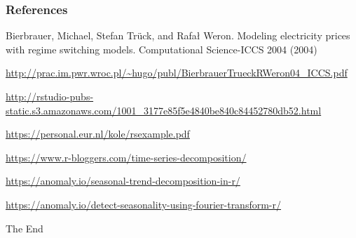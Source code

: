\documentclass{beamer}
\begin{document}

\begin{frame}
\frametitle{References}
\footnotesize{
\begin{thebibliography}{99} %
 Bierbrauer, Michael, Stefan Trück, and Rafał Weron.
\newblock Modeling electricity prices with regime switching models.
\newblock Computational Science-ICCS 2004 (2004)

 \url{http://prac.im.pwr.wroc.pl/~hugo/publ/BierbrauerTrueckRWeron04_ICCS.pdf}

 \url{http://rstudio-pubs-static.s3.amazonaws.com/1001_3177e85f5e4840be840c84452780db52.html}

 \url{https://personal.eur.nl/kole/rsexample.pdf}

 \url{https://www.r-bloggers.com/time-series-decomposition/}

 \url{https://anomaly.io/seasonal-trend-decomposition-in-r/}

 \url{https://anomaly.io/detect-seasonality-using-fourier-transform-r/}

\end{thebibliography}
}
\end{frame}

\begin{frame}
\Huge{\centerline{The End}}
\end{frame}

\end{document}
